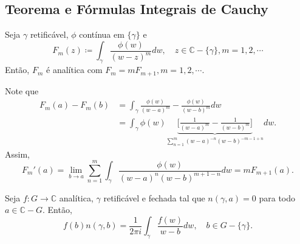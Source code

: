 \documentclass[complex.tex]{subfiles}
\begin{document}
\subsection{Teorema e Fórmulas Integrais de Cauchy}
\begin{lmm*}
	Seja $\gamma$ retificável, $\phi$ contínua em $\{\gamma\} $ e
	$$
		F_{m}(z)\coloneqq  \int_{\gamma}^{}\frac{\phi(w)}{(w-z)^{m}}dw, \quad z\in \mathbb{C}-\{\gamma\}, m=1, 2, \cdots
	$$
	Então, $F_{m}$ é analítica com $F_{m} = mF_{m+1}, m = 1, 2, \cdots$.
\end{lmm*}
\begin{proof*}
	Note que
	\begin{align*}
		F_{m}(a) - F_{m}(b) & = \int_{\gamma}^{}\frac{\phi(w)}{(w-a)^{m}} - \frac{\phi(w)}{(w-b)^{m}}dw                                                                        \\
		                    & = \int_{\gamma}^{}\phi(w)\underbrace{\biggl[\frac{1}{(w-a)^{m}} - \frac{1}{(w-b)^{m}}\biggr]}_{\sum\limits_{n=1}^{m}(w-a)^{-n}(w-b)^{-m-1+n}}dw.
	\end{align*}
	Assim,
	$$
		F_{m}'(a) = \lim_{b\to{a}}\sum\limits_{n=1}^{m}\int_{\gamma}^{}\frac{\phi(w)}{(w-a)^{n}(w-b)^{m+1-n}}dw = mF_{m+1}(a).
	$$
\end{proof*}
\begin{theorem*}
	Seja $f:G\rightarrow \mathbb{C}$ analítica, $\gamma$ retificável e fechada tal que $n(\gamma, a) = 0$ para todo $a\in \mathbb{C}-G.$
	Então,
	$$
		f(b)n(\gamma, b) = \frac{1}{2\pi i}\int_{\gamma}^{}\frac{f(w)}{w-b}dw, \quad b\in{G-\{\gamma\}}.
	$$
\end{theorem*}
\end{document}
